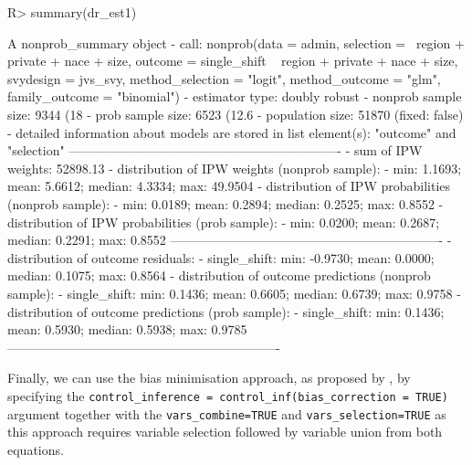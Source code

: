 \documentclass[
]{jss}
\begin{document}
\begin{CodeChunk}
\begin{CodeInput}
R> summary(dr_est1)
\end{CodeInput}
\begin{CodeOutput}
A nonprob_summary object
 - call: nonprob(data = admin, selection = ~region + private + nace + 
    size, outcome = single_shift ~ region + private + nace + 
    size, svydesign = jvs_svy, method_selection = "logit", method_outcome = "glm", 
    family_outcome = "binomial")
 - estimator type: doubly robust
 - nonprob sample size: 9344 (18%
 - prob sample size: 6523 (12.6%
 - population size: 51870 (fixed: false)
 - detailed information about models are stored in list element(s): "outcome" and "selection"
----------------------------------------------------------------
 - sum of IPW weights: 52898.13 
 - distribution of IPW weights (nonprob sample):
   - min: 1.1693; mean: 5.6612; median: 4.3334; max: 49.9504
 - distribution of IPW probabilities (nonprob sample):
   - min: 0.0189; mean: 0.2894; median: 0.2525; max: 0.8552
 - distribution of IPW probabilities (prob sample):
   - min: 0.0200; mean: 0.2687; median: 0.2291; max: 0.8552
----------------------------------------------------------------
 - distribution of outcome residuals:
   - single_shift: min: -0.9730; mean: 0.0000; median: 0.1075; max: 0.8564
 - distribution of outcome predictions (nonprob sample):
   - single_shift: min: 0.1436; mean: 0.6605; median: 0.6739; max: 0.9758
 - distribution of outcome predictions (prob sample):
   - single_shift: min: 0.1436; mean: 0.5930; median: 0.5938; max: 0.9785
----------------------------------------------------------------
\end{CodeOutput}
\end{CodeChunk}

Finally, we can use the bias minimisation approach, as proposed by
\citet{yang_doubly_2020}, by specifying the
\texttt{control\_inference\ =\ control\_inf(bias\_correction\ =\ TRUE)}
argument together with the \texttt{vars\_combine=TRUE} and
\texttt{vars\_selection=TRUE} as this approach requires variable
selection followed by variable union from both equations.
\end{document}
